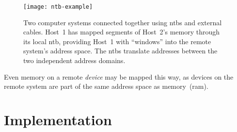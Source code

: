 \begin{figure}
    \centering
    \texttt{[image: ntb-example]}
    \caption[Two computer systems connected using , and the  translate between the two different address domains]
    {Two computer systems connected together using \glspl{ntb} and external cables. Host~1 has mapped segments of Host~2's memory through its local \gls{ntb}, providing Host~1 with ``windows'' into the remote system's address space. The \glspl{ntb} translate addresses between the two independent address domains.}
    \label{fig:ntb-example}
\end{figure}


Even memory on a remote \emph{device} may be mapped this way, as devices on the remote system are part of the same address space as memory~(\gls{ram}).









\section{Implementation}\label{sec:impl}



